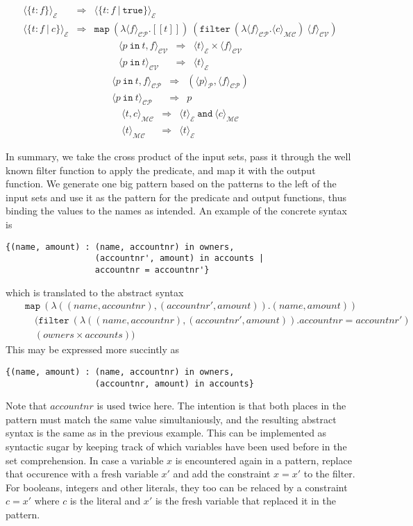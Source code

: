 \documentclass[a4paper]{article}
\newcommand{\s}[1]{\mathtt{#1}}
\newcommand{\sugar}[2]{\langle#2\rangle_{\mathcal{#1}}}
\newcommand{\sug}[1]{\sugar{E}{#1}}
\begin{document}
\begin{eqnarray*}
\sug{\{t:f\}} & \Longrightarrow & \sug{\{t:f\ |\ \s{true}\}} \\
\sug{\{t:f\ |\ c\}} & \Longrightarrow &
\s{map\ }
(\lambda \sugar{CP}{f}. [\![ t ]\!])\
(\s{filter\ } (\lambda \sugar{CP}{f}. \sugar{MC}{c})\
\sugar{CV}{f})
\end{eqnarray*}
\begin{eqnarray*}
\sugar{CV}{p\s{\ in\ } t, f} & \Longrightarrow & \sug{t} \times \sugar{CV}{f} \\
\sugar{CV}{p\s{\ in\ } t} & \Longrightarrow & \sug{t}
\end{eqnarray*}
\begin{eqnarray*}
\sugar{CP}{p\s{\ in\ } t, f} & \Longrightarrow & (\sugar{P}{p}, \sugar{CP}{f}) \\
\sugar{CP}{p\s{\ in\ } t} & \Longrightarrow & p
\end{eqnarray*}
\begin{eqnarray*}
\sugar{MC}{t, c} & \Longrightarrow & \sug{t} \s{\ and\ } \sugar{MC}{c} \\
\sugar{MC}{t} & \Longrightarrow & \sug{t}
\end{eqnarray*}

In summary, we take the cross product of the input sets, pass it
through the well known filter function to apply the predicate,
and map it with the output function. We generate one big pattern
based on the patterns to the left of the input sets and use it as
the pattern for the predicate and output functions, thus binding
the values to the names as intended. An example of the concrete
syntax is
\begin{verbatim}
{(name, amount) : (name, accountnr) in owners,
                  (accountnr', amount) in accounts |
                  accountnr = accountnr'}
\end{verbatim}
which is translated to the abstract syntax
\begin{eqnarray*}
&&\s{map\ } (\lambda ((name, accountnr), (accountnr', amount)). (name, amount))\\
&&\quad(\s{filter\ } (\lambda ((name, accountnr), (accountnr', amount)). accountnr = accountnr')\\
&&\quad(owners \times accounts))
\end{eqnarray*}
This may be expressed more succintly as
\begin{verbatim}
{(name, amount) : (name, accountnr) in owners,
                  (accountnr, amount) in accounts}
\end{verbatim}
Note that $accountnr$ is used twice here. The intention is that
both places in the pattern must match the same value
simultaniously, and the resulting abstract syntax is the same as
in the previous example. This can be implemented as syntactic sugar
by keeping track of which variables have been used before in the
set comprehension. In case a variable $x$ is encountered again in a
pattern, replace that occurence with a fresh variable $x'$ and add
the constraint $x = x'$ to
the filter. For booleans, integers and other literals, they too can
be relaced by a constraint $c = x'$ where $c$ is the literal and
$x'$ is the fresh variable that replaced it in the pattern.

\newpage
\begin{appendices}
\end{appendices}

\newpage
%
%
\end{document}
